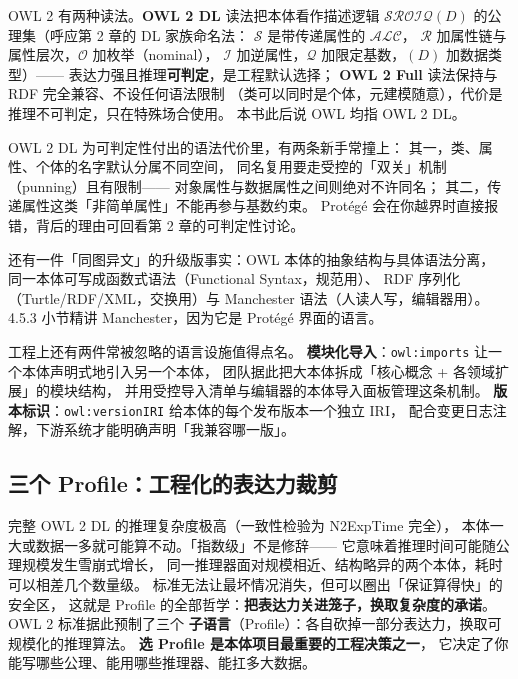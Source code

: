 OWL 2 有两种读法。\textbf{OWL 2 DL} 读法把本体看作描述逻辑
\(\mathcal{SROIQ}(D)\) 的公理集（呼应第 2 章的 DL 家族命名法：
\(\mathcal{S}\) 是带传递属性的 \(\mathcal{ALC}\)，
\(\mathcal{R}\) 加属性链与属性层次，\(\mathcal{O}\) 加枚举（nominal），
\(\mathcal{I}\) 加逆属性，\(\mathcal{Q}\) 加限定基数，\((D)\) 加数据类型）——
表达力强且推理\textbf{可判定}，是工程默认选择；
\textbf{OWL 2 Full} 读法保持与 RDF 完全兼容、不设任何语法限制
（类可以同时是个体，元建模随意），代价是推理不可判定，只在特殊场合使用。
本书此后说 OWL 均指 OWL 2 DL。

OWL 2 DL 为可判定性付出的语法代价里，有两条新手常撞上：
其一，类、属性、个体的名字默认分属不同空间，
同名复用要走受控的「双关」机制（punning）且有限制——
对象属性与数据属性之间则绝对不许同名；
其二，传递属性这类「非简单属性」不能再参与基数约束。
Protégé 会在你越界时直接报错，背后的理由可回看第 2 章的可判定性讨论。

还有一件「同图异文」的升级版事实：OWL 本体的抽象结构与具体语法分离，
同一本体可写成函数式语法（Functional Syntax，规范用）、
RDF 序列化（Turtle/RDF/XML，交换用）与 Manchester 语法（人读人写，编辑器用）。
4.5.3 小节精讲 Manchester，因为它是 Protégé 界面的语言。

工程上还有两件常被忽略的语言设施值得点名。
\textbf{模块化导入}：\texttt{owl:imports} 让一个本体声明式地引入另一个本体，
团队据此把大本体拆成「核心概念 + 各领域扩展」的模块结构，
并用受控导入清单与编辑器的本体导入面板管理这条机制。
\textbf{版本标识}：\texttt{owl:versionIRI} 给本体的每个发布版本一个独立 IRI，
配合变更日志注解，下游系统才能明确声明「我兼容哪一版」。

\subsection{三个 Profile：工程化的表达力裁剪}

完整 OWL 2 DL 的推理复杂度极高（一致性检验为 N2ExpTime 完全），
本体一大或数据一多就可能算不动。「指数级」不是修辞——
它意味着推理时间可能随公理规模发生雪崩式增长，
同一推理器面对规模相近、结构略异的两个本体，耗时可以相差几个数量级。
标准无法让最坏情况消失，但可以圈出「保证算得快」的安全区，
这就是 Profile 的全部哲学：\textbf{把表达力关进笼子，换取复杂度的承诺}。
OWL 2 标准据此预制了三个
\textbf{子语言}（Profile）：各自砍掉一部分表达力，换取可规模化的推理算法。
\textbf{选 Profile 是本体项目最重要的工程决策之一}，
它决定了你能写哪些公理、能用哪些推理器、能扛多大数据。


